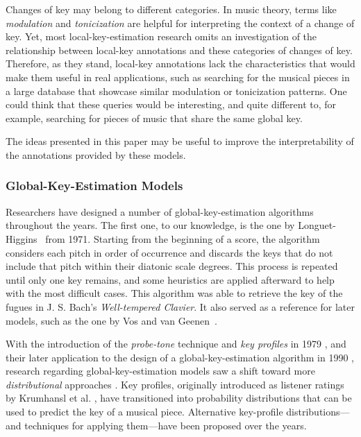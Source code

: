 Changes of key may belong to different categories. 
In music theory, terms like \emph{modulation} and \emph{tonicization} are helpful for interpreting the context of a change of key. 
Yet, most local-key-estimation research omits an investigation of the relationship between local-key annotations and these categories of changes of key. 
Therefore, as they stand, local-key annotations lack the characteristics that would make them useful in real applications, such as searching for the musical pieces in a large database that showcase similar modulation or tonicization patterns. 
One could think that these queries would be interesting, and quite different to, for example, searching for pieces of music that share the same global key. 

The ideas presented in this paper may be useful to improve the interpretability of the annotations provided by these models.



\subsubsection{Global-Key-Estimation Models}
Researchers have designed a number of global-key-estimation algorithms throughout the years. 
The first one, to our knowledge, is the one by Longuet-Higgins~\cite{longuet1971tonality} from 1971.
Starting from the beginning of a score, the algorithm considers each pitch in order of occurrence and discards the keys that do not include that pitch within their diatonic scale degrees. 
This process is repeated until only one key remains, and some heuristics are applied afterward to help with the most difficult cases. This algorithm was able to retrieve the key of the fugues in J. S. Bach's \emph{Well-tempered Clavier}. 
It also served as a reference for later models, such as the one by Vos and van Geenen~\cite{vos96keyfinding}.

With the introduction of the \emph{probe-tone} technique and \emph{key profiles} in 1979 \cite{krumhansl_quantification_1979}, and their later application to the design of a global-key-estimation algorithm in 1990 \cite{krumhansl_cognitive_1990}, research regarding global-key-estimation models saw a shift toward more \emph{distributional} approaches \cite{temperley2008pitch}. 
Key profiles, originally introduced as listener ratings by Krumhansl et al. \cite{krumhansl_quantification_1979, krumhansl_tracing_1982}, have transitioned into probability distributions that can be used to predict the key of a musical piece.
Alternative key-profile distributions---and techniques for applying them---have been proposed over the years.

